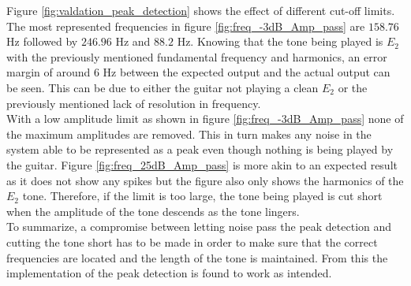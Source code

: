 Figure \ref{fig:valdation_peak_detection} shows the effect of different cut-off limits. The most represented frequencies in figure \ref{fig:freq_-3dB_Amp_pass} are $158.76$ Hz followed by $246.96$ Hz and $88.2$ Hz. 
Knowing that the tone being played is $E_2$ with the previously mentioned fundamental frequency and harmonics, an error margin of around $6$ Hz between the expected output and the actual output can be seen.
This can be due to either the guitar not playing a clean $E_2$ or the previously mentioned lack of resolution in frequency.
\\
With a low amplitude limit as shown in figure \ref{fig:freq_-3dB_Amp_pass} none of the maximum amplitudes are removed. This in turn makes any noise in the system able to be represented as a peak even though nothing is being played by the guitar.
Figure \ref{fig:freq_25dB_Amp_pass} is more akin to an expected result as it does not show any spikes but the figure also only shows the harmonics of the $E_2$ tone.
Therefore, if the limit is too large, the tone being played is cut short when the amplitude of the tone descends as the tone lingers.
\\
To summarize, a compromise between letting noise pass the peak detection and cutting the tone short has to be made in order to make sure that the correct frequencies are located and the length of the tone is maintained. From this the implementation of the peak detection is found to work as intended.